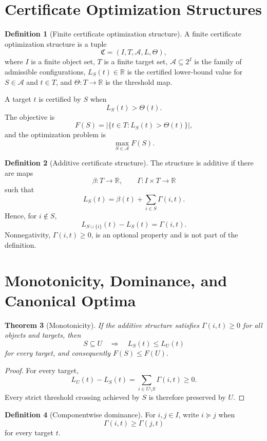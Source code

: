 \documentclass[11pt]{article}
\newtheorem{theorem}{Theorem}[section]
\theoremstyle{definition}
\newtheorem{definition}[theorem]{Definition}
\theoremstyle{remark}
\newcommand{\R}{\mathbb{R}}
\begin{document}
\section{Certificate Optimization Structures}

\begin{definition}[Finite certificate optimization structure]\label{def:cof-structure}
A finite certificate optimization structure is a tuple
\[
\mathfrak C=(I,T,\mathcal A,L,\Theta),
\]
where $I$ is a finite object set, $T$ is a finite target set, $\mathcal A\subseteq 2^I$ is the family of admissible configurations, $L_S(t)\in\R$ is the certified lower-bound value for $S\in\mathcal A$ and $t\in T$, and $\Theta:T\to\R$ is the threshold map.

A target $t$ is certified by $S$ when
\[
L_S(t)>\Theta(t).
\]
The objective is
\[
F(S)=\bigl|\{t\in T:L_S(t)>\Theta(t)\}\bigr|,
\]
and the optimization problem is
\[
\max_{S\in\mathcal A}F(S).
\]
\end{definition}

\begin{definition}[Additive certificate structure]\label{def:additive}
The structure is additive if there are maps
\[
\beta:T\to\R,
\qquad
\Gamma:I\times T\to\R
\]
such that
\[
L_S(t)=\beta(t)+\sum_{i\in S}\Gamma(i,t).
\]
Hence, for $i\notin S$,
\[
L_{S\cup\{i\}}(t)-L_S(t)=\Gamma(i,t).
\]
Nonnegativity, $\Gamma(i,t)\ge 0$, is an optional property and is not part of the definition.
\end{definition}

\section{Monotonicity, Dominance, and Canonical Optima}

\begin{theorem}[Monotonicity]\label{thm:monotonicity}
If the additive structure satisfies $\Gamma(i,t)\ge0$ for all objects and targets, then
\[
S\subseteq U
\quad\Longrightarrow\quad
L_S(t)\le L_U(t)
\]
for every target, and consequently $F(S)\le F(U)$.
\end{theorem}

\begin{proof}
For every target,
\[
L_U(t)-L_S(t)=\sum_{i\in U\setminus S}\Gamma(i,t)\ge0.
\]
Every strict threshold crossing achieved by $S$ is therefore preserved by $U$.
\end{proof}

\begin{definition}[Componentwise dominance]\label{def:dominance}
For $i,j\in I$, write $i\succeq j$ when
\[
\Gamma(i,t)\ge\Gamma(j,t)
\]
for every target $t$.
\end{definition}
\end{document}
